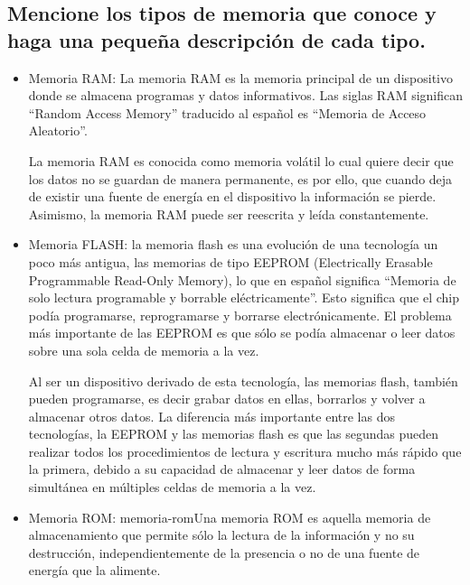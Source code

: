 \documentclass{article}
\begin{document}
\subsection{Mencione los tipos de memoria que conoce y haga una pequeña descripción de cada tipo.}
\begin{itemize}
    \item     Memoria RAM: La memoria RAM es la memoria principal de un dispositivo donde se almacena programas y datos informativos. Las siglas RAM significan “Random Access Memory” traducido al español es “Memoria de Acceso Aleatorio”\cite{ram}.

La memoria RAM es conocida como memoria volátil lo cual quiere decir que los datos no se guardan de manera permanente, es por ello, que cuando deja de existir una fuente de energía en el dispositivo la información se pierde. Asimismo, la memoria RAM puede ser reescrita y leída constantemente.
    \item     Memoria FLASH: la memoria flash es una evolución de una tecnología un poco más antigua, las memorias de tipo EEPROM (Electrically Erasable Programmable Read-Only Memory), lo que en español significa “Memoria de solo lectura programable y borrable eléctricamente”. Esto significa que el chip podía programarse, reprogramarse y borrarse electrónicamente. El problema más importante de las EEPROM es que sólo se podía almacenar o leer datos sobre una sola celda de memoria a la vez.
    
    \vspace{0.5cm}
    \noindent
    Al ser un dispositivo derivado de esta tecnología, las memorias flash, también pueden programarse, es decir grabar datos en ellas, borrarlos y volver a almacenar otros datos. La diferencia más importante entre las dos tecnologías, la EEPROM y las memorias flash es que las segundas pueden realizar todos los procedimientos de lectura y escritura mucho más rápido que la primera, debido a su capacidad de almacenar y leer datos de forma simultánea en múltiples celdas de memoria a la vez.\cite{flash}
    \item     Memoria ROM: 
memoria-romUna memoria ROM es aquella memoria de almacenamiento que permite sólo la lectura de la información y no su destrucción, independientemente de la presencia o no de una fuente de energía que la alimente.


\end{itemize}
\end{document}
